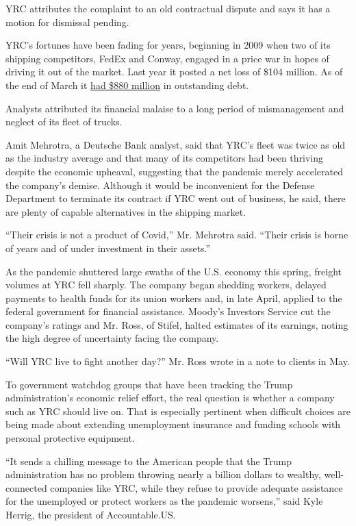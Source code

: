 YRC attributes the complaint to an old contractual dispute and says it
has a motion for dismissal pending.

YRC's fortunes have been fading for years, beginning in 2009 when two of
its shipping competitors, FedEx and Conway, engaged in a price war in
hopes of driving it out of the market. Last year it posted a net loss of
\$104 million. As of the end of March it
\href{https://www.globenewswire.com/news-release/2020/05/11/2031400/0/en/YRC-Worldwide-Reports-First-Quarter-2020-Results.html\#:~:text=OVERLAND\%20PARK\%2C\%20Kan.\%2C\%20May,net\%20gain\%20on\%20property\%20sales.}{had
\$880 million} in outstanding debt.

Analysts attributed its financial malaise to a long period of
mismanagement and neglect of its fleet of trucks.

Amit Mehrotra, a Deutsche Bank analyst, said that YRC's fleet was twice
as old as the industry average and that many of its competitors had been
thriving despite the economic upheaval, suggesting that the pandemic
merely accelerated the company's demise. Although it would be
inconvenient for the Defense Department to terminate its contract if YRC
went out of business, he said, there are plenty of capable alternatives
in the shipping market.

``Their crisis is not a product of Covid,'' Mr. Mehrotra said. ``Their
crisis is borne of years and of under investment in their assets.''

As the pandemic shuttered large swaths of the U.S. economy this spring,
freight volumes at YRC fell sharply. The company began shedding workers,
delayed payments to health funds for its union workers and, in late
April, applied to the federal government for financial assistance.
Moody's Investors Service cut the company's ratings and Mr. Ross, of
Stifel, halted estimates of its earnings, noting the high degree of
uncertainty facing the company.

``Will YRC live to fight another day?'' Mr. Ross wrote in a note to
clients in May.

To government watchdog groups that have been tracking the Trump
administration's economic relief effort, the real question is whether a
company such as YRC should live on. That is especially pertinent when
difficult choices are being made about extending unemployment insurance
and funding schools with personal protective equipment.

``It sends a chilling message to the American people that the Trump
administration has no problem throwing nearly a billion dollars to
wealthy, well-connected companies like YRC, while they refuse to provide
adequate assistance for the unemployed or protect workers as the
pandemic worsens,'' said Kyle Herrig, the president of Accountable.US.

